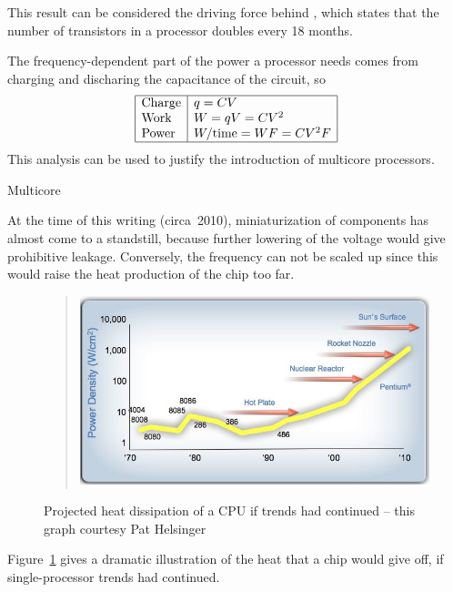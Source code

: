 This result can be considered
the driving force behind ,
which states that the number of transistors in a processor
doubles every 18 months.

The frequency-dependent part of the power a processor needs
comes from charging and discharing the capacitance of the circuit, so
\begin{equation}
\begin{array}{|l|l|} \hline
\hbox{Charge}&q=CV\\
\hbox{Work}&W=qV=CV^2\\
\hbox{Power}&W/\hbox{time}=WF=CV^2F \\ \hline
\end{array}
\label{eq:power}
\end{equation}
This analysis can be used to justify the introduction of multicore processors.

 {Multicore}

At the time of this writing (circa~2010), miniaturization of
components has almost come to a standstill, because further lowering
of the voltage would give prohibitive leakage. Conversely, the
frequency can not be scaled up since this would raise the heat
production of the chip too far. 
%
\begin{figure}[ht]
  \begin{quote}
  \includegraphics[scale=.6]{graphics/chipheat0}
  \end{quote}
  \caption{Projected heat dissipation of a CPU if trends had
    continued -- this graph courtesy Pat Helsinger}
  \label{fig:chipheat}
\end{figure}
%
Figure~\ref{fig:chipheat} gives a dramatic illustration of the heat
that a chip would give off, if single-processor trends had
continued.

